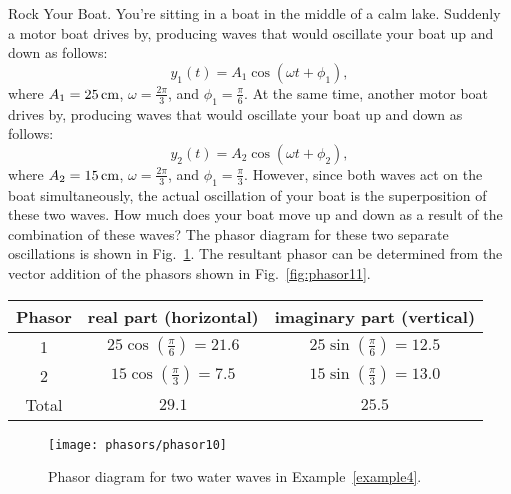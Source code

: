 \begin{example}{Rock Your Boat.} 
\label{example4}
You're sitting in a boat in the middle of a calm lake. Suddenly a motor
boat drives by, producing waves that would oscillate your boat up and
down as follows:
\begin{equation}
y_1(t) = A_1\cos{(\omega t + \phi_1)}, 
\end{equation}
where $A_1 = 25\,\mbox{cm}$, $\omega = \frac{2\pi}{3}$, and
$\phi_1 = \frac{\pi}{6}$. At the same time, another motor boat drives
by, producing waves that would oscillate your boat up and down as follows:
\begin{equation}
y_2(t) = A_2\cos{(\omega t + \phi_2)}, 
\end{equation}
where $A_2 = 15\,\mbox{cm}$, $\omega = \frac{2\pi}{3}$, and
$\phi_1 = \frac{\pi}{3}$. However, since both waves act on the boat
simultaneously, the actual oscillation of your boat is the
superposition of these two waves. How much does your boat move up and
down as a result of the combination of these waves?
\solution
The phasor diagram for these two separate oscillations %
is shown in Fig.~\ref{fig:phasor10}.
The resultant phasor can be determined from the vector addition of the
phasors shown in Fig.~\ref{fig:phasor11}.

\renewcommand{\arraystretch}{2.0}
\begin{center}
\begin{tabular}{|c|c|c|}\hline
\quad Phasor\quad &
\quad real part (horizontal) \quad &
\quad imaginary part (vertical) \quad \\ 
\hline\hline
1      & $25\cos\left(\frac{\pi}{6}\right) = 21.6$ 
       & $25\sin\left(\frac{\pi}{6}\right) = 12.5$ \\ \hline 
2      & $15\cos\left(\frac{\pi}{3}\right) =7.5$ 
       & $15\sin\left(\frac{\pi}{3}\right) =13.0$ \\
\hline\hline
Total  & $29.1$   & $25.5$ \\
\hline
\end{tabular}
\end{center}
\renewcommand{\arraystretch}{1.0}

\begin{figure}\begin{center}
 \texttt{[image: phasors/phasor10]} 
\caption{\label{fig:phasor10}Phasor diagram for 
two water waves in Example~\ref{example4}. }
\end{center}
\end{figure}


\end{example}
